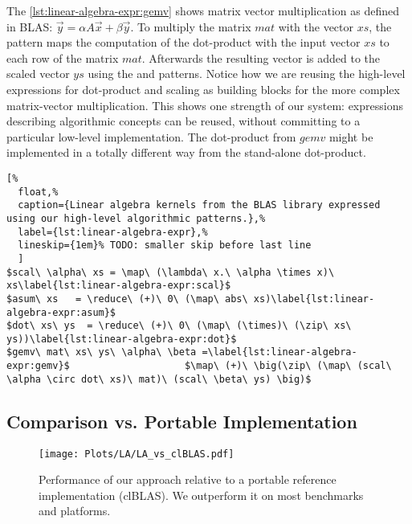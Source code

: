 The \autoref{lst:linear-algebra-expr:gemv} shows matrix vector multiplication as defined in BLAS: $\vec{y} = \alpha A \vec{x} + \beta \vec{y}$.
To multiply the matrix $mat$ with the vector $xs$, the \map pattern maps the computation of the dot-product with the input vector $xs$ to each row of the matrix $mat$.
Afterwards the resulting vector is added to the scaled vector $ys$ using the \zip and \map patterns.
Notice how we are reusing the high-level expressions for dot-product and scaling as building blocks for the more complex matrix-vector multiplication.
This shows one strength of our system: expressions describing algorithmic concepts can be reused, without committing to a particular low-level implementation.
The dot-product from $gemv$ might be implemented in a totally different way from the stand-alone dot-product.

\begin{lstlisting}[%
  float,%
  caption={Linear algebra kernels from the BLAS library expressed using our high-level algorithmic patterns.},%
  label={lst:linear-algebra-expr},%
  lineskip={1em}% TODO: smaller skip before last line
  ]
$scal\ \alpha\ xs = \map\ (\lambda\ x.\ \alpha \times x)\ xs\label{lst:linear-algebra-expr:scal}$
$asum\ xs   = \reduce\ (+)\ 0\ (\map\ abs\ xs)\label{lst:linear-algebra-expr:asum}$
$dot\ xs\ ys  = \reduce\ (+)\ 0\ (\map\ (\times)\ (\zip\ xs\ ys))\label{lst:linear-algebra-expr:dot}$
$gemv\ mat\ xs\ ys\ \alpha\ \beta =\label{lst:linear-algebra-expr:gemv}$                    $\map\ (+)\ \big(\zip\ (\map\ (scal\ \alpha \circ dot\ xs)\ mat)\ (scal\ \beta\ ys) \big)$
\end{lstlisting}




\subsection{Comparison vs. Portable Implementation}

\begin{figure}[t]
  \centering
  \texttt{[image: Plots/LA/LA\_vs\_clBLAS.pdf]}
  \caption[Performance of our approach relative to a portable \OpenCL reference implementation]%
          {Performance of our approach relative to a portable \OpenCL reference implementation (clBLAS).
           We outperform it on most benchmarks and platforms.}
  \label{fig:linear-algebra-expr:clblas}
\end{figure}

